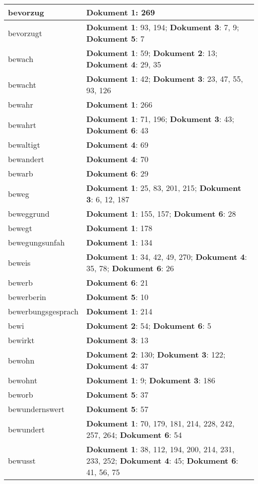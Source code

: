 \documentclass[a5paper]{article}
\begin{document}
\begin{longtable}[l]{|l|p{3in}|}
\hline
bevorzug & \textbf{Dokument 1}: 269 \\
\hline
bevorzugt & \textbf{Dokument 1}: 93, 194; \textbf{Dokument 3}: 7, 9; \textbf{Dokument 5}: 7 \\
\hline
bewach & \textbf{Dokument 1}: 59; \textbf{Dokument 2}: 13; \textbf{Dokument 4}: 29, 35 \\
\hline
bewacht & \textbf{Dokument 1}: 42; \textbf{Dokument 3}: 23, 47, 55, 93, 126 \\
\hline
bewahr & \textbf{Dokument 1}: 266 \\
\hline
bewahrt & \textbf{Dokument 1}: 71, 196; \textbf{Dokument 3}: 43; \textbf{Dokument 6}: 43 \\
\hline
bewaltigt & \textbf{Dokument 4}: 69 \\
\hline
bewandert & \textbf{Dokument 4}: 70 \\
\hline
bewarb & \textbf{Dokument 6}: 29 \\
\hline
beweg & \textbf{Dokument 1}: 25, 83, 201, 215; \textbf{Dokument 3}: 6, 12, 187 \\
\hline
beweggrund & \textbf{Dokument 1}: 155, 157; \textbf{Dokument 6}: 28 \\
\hline
bewegt & \textbf{Dokument 1}: 178 \\
\hline
bewegungsunfah & \textbf{Dokument 1}: 134 \\
\hline
beweis & \textbf{Dokument 1}: 34, 42, 49, 270; \textbf{Dokument 4}: 35, 78; \textbf{Dokument 6}: 26 \\
\hline
bewerb & \textbf{Dokument 6}: 21 \\
\hline
bewerberin & \textbf{Dokument 5}: 10 \\
\hline
bewerbungsgesprach & \textbf{Dokument 1}: 214 \\
\hline
bewi & \textbf{Dokument 2}: 54; \textbf{Dokument 6}: 5 \\
\hline
bewirkt & \textbf{Dokument 3}: 13 \\
\hline
bewohn & \textbf{Dokument 2}: 130; \textbf{Dokument 3}: 122; \textbf{Dokument 4}: 37 \\
\hline
bewohnt & \textbf{Dokument 1}: 9; \textbf{Dokument 3}: 186 \\
\hline
beworb & \textbf{Dokument 5}: 37 \\
\hline
bewundernswert & \textbf{Dokument 5}: 57 \\
\hline
bewundert & \textbf{Dokument 1}: 70, 179, 181, 214, 228, 242, 257, 264; \textbf{Dokument 6}: 54 \\
\hline
bewusst & \textbf{Dokument 1}: 38, 112, 194, 200, 214, 231, 233, 252; \textbf{Dokument 4}: 45; \textbf{Dokument 6}: 41, 56, 75 \\

\end{longtable}
\end{document}

